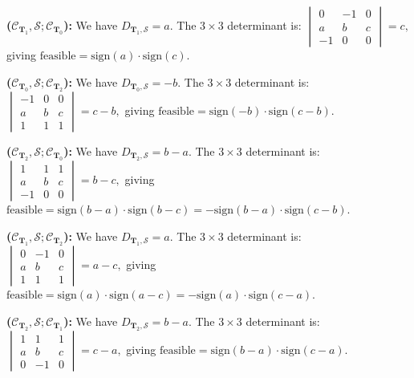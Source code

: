 \documentclass[12pt]{article}
\makeatletter
\theoremstyle{definition}
\theoremstyle{remark}
\renewenvironment{proof}[1][\proofname]{\par
  \pushQED{\qed}%
  \normalfont \footnotesize \topsep6\p@\@plus6\p@\relax
  \list{}{\leftmargin=2em
          \settowidth{\itemindent}{\itshape#1}%
          \labelwidth=\itemindent
          \parsep=0pt \listparindent=\parindent 
  }
  \item[\hskip\labelsep
        \itshape
    #1\@addpunct{.}]\ignorespaces
}{%
  \popQED\endlist\@endpefalse
}
\makeatother
\begin{document}
\begin{proof}
\noindent
\textbf{($\mathcal{C}_{\mathbf{T}_1}, \mathcal{S}; \mathcal{C}_{\mathbf{T}_0}$):} We have $D_{\mathbf{T}_1, \mathcal{S}} = a$. The $3\times 3$ determinant is:
$
    \begin{vmatrix}
        0   & -1  & 0   \\
        a & b & c \\
        -1  & 0   & 0
    \end{vmatrix} = c,
$
giving $\mathrm{feasible} = \mathrm{sign}(a) \cdot \mathrm{sign}(c)$.

\noindent
\textbf{($\mathcal{C}_{\mathbf{T}_0}, \mathcal{S}; \mathcal{C}_{\mathbf{T}_2}$):} We have $D_{\mathbf{T}_0, \mathcal{S}} = -b$. The $3\times 3$ determinant is:
$
    \begin{vmatrix}
        -1  & 0   & 0   \\
        a & b & c \\
        1   & 1   & 1
    \end{vmatrix} = c - b,
$
giving $\mathrm{feasible} = \mathrm{sign}(-b) \cdot \mathrm{sign}(c - b)$.

\noindent
\textbf{($\mathcal{C}_{\mathbf{T}_2}, \mathcal{S}; \mathcal{C}_{\mathbf{T}_0}$):} We have $D_{\mathbf{T}_2, \mathcal{S}} = b - a$. The $3\times 3$ determinant is:
$
    \begin{vmatrix}
        1   & 1   & 1   \\
        a & b & c \\
        -1  & 0   & 0
    \end{vmatrix} = b - c,
$
giving $\mathrm{feasible} = \mathrm{sign}(b - a) \cdot \mathrm{sign}(b - c) = -\mathrm{sign}(b - a) \cdot \mathrm{sign}(c-b)$.

\noindent
\textbf{($\mathcal{C}_{\mathbf{T}_1}, \mathcal{S}; \mathcal{C}_{\mathbf{T}_2}$):} We have $D_{\mathbf{T}_1, \mathcal{S}} = a$. The $3\times 3$ determinant is:
$
    \begin{vmatrix}
        0   & -1  & 0   \\
        a & b & c \\
        1   & 1   & 1
    \end{vmatrix} = a - c,
$
giving $\mathrm{feasible} = \mathrm{sign}(a) \cdot \mathrm{sign}(a - c) = -\mathrm{sign}(a) \cdot \mathrm{sign}(c-a)$.

\noindent
\textbf{($\mathcal{C}_{\mathbf{T}_2}, \mathcal{S}; \mathcal{C}_{\mathbf{T}_1}$):} We have $D_{\mathbf{T}_2, \mathcal{S}} = b - a$. The $3\times 3$ determinant is:
$
    \begin{vmatrix}
        1   & 1   & 1   \\
        a & b & c \\
        0   & -1  & 0
    \end{vmatrix} = c - a,
$
giving $\mathrm{feasible} = \mathrm{sign}(b - a) \cdot \mathrm{sign}(c - a)$.


\end{proof}
\end{document}
